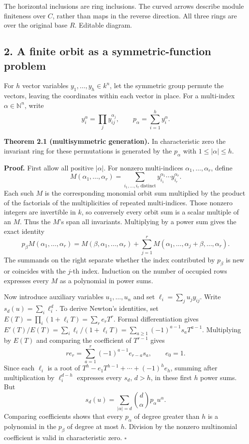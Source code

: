 \documentclass[
]{article}
\begin{document}
The horizontal inclusions are ring inclusions. The curved arrows
describe module finiteness over \(C\), rather than maps in the reverse
direction. All three rings are over the original base \(R\). Editable
diagram.

\subsection{2. A finite orbit as a symmetric-function
problem}\label{a-finite-orbit-as-a-symmetric-function-problem}

For \(h\) vector variables \(y_1,\ldots,y_h\in k^n\), let the symmetric
group permute the vectors, leaving the coordinates within each vector in
place. For a multi-index \(\alpha\in\mathbb N^n\), write \[
y_i^\alpha=\prod_j y_{ij}^{\alpha_j},\qquad
p_\alpha=\sum_{i=1}^h y_i^\alpha.
\]

\protect{}\label{theorem-2-1}{}

\textbf{Theorem 2.1 (multisymmetric generation).} In characteristic zero
the invariant ring for these permutations is generated by the
\(p_\alpha\) with \(1\leq|\alpha|\leq h\).

\textbf{Proof.} First allow all positive \(|\alpha|\). For nonzero
multi-indices \(\alpha_1,\ldots,\alpha_r\), define \[
M(\alpha_1,\ldots,\alpha_r)
=\sum_{i_1,\ldots,i_r\ \mathrm{distinct}}
y_{i_1}^{\alpha_1}\cdots y_{i_r}^{\alpha_r}.
\] Each such \(M\) is the corresponding monomial orbit sum multiplied by
the product of the factorials of the multiplicities of repeated
multi-indices. Those nonzero integers are invertible in \(k\), so
conversely every orbit sum is a scalar multiple of an \(M\). Thus the
\(M\)'s span all invariants. Multiplying by a power sum gives the exact
identity \[
p_\beta M(\alpha_1,\ldots,\alpha_r)
=M(\beta,\alpha_1,\ldots,\alpha_r)
+\sum_{j=1}^r M(\alpha_1,\ldots,\alpha_j+\beta,\ldots,\alpha_r).
\] The summands on the right separate whether the index contributed by
\(p_\beta\) is new or coincides with the \(j\)-th index. Induction on
the number of occupied rows expresses every \(M\) as a polynomial in
power sums.

Now introduce auxiliary variables \(u_1,\ldots,u_n\) and set
\(\ell_i=\sum_j u_jy_{ij}\). Write \(s_d(u)=\sum_i\ell_i^d\). To derive
Newton's identities, set \(E(T)=\prod_i(1+\ell_iT)=\sum_r e_rT^r\).
Formal differentiation gives
\(E'(T)/E(T)=\sum_i\ell_i/(1+\ell_iT)=\sum_{a\geq1}(-1)^{a-1}s_aT^{a-1}\).
Multiplying by \(E(T)\) and comparing the coefficient of \(T^{r-1}\)
gives \[
r e_r=\sum_{a=1}^r(-1)^{a-1}e_{r-a}s_a,\qquad e_0=1.
\] Since each \(\ell_i\) is a root of
\(T^h-e_1T^{h-1}+\cdots+(-1)^he_h\), summing after multiplication by
\(\ell_i^{d-h}\) expresses every \(s_d\), \(d>h\), in these first \(h\)
power sums. But \[
s_d(u)=\sum_{|\alpha|=d}\binom d\alpha p_\alpha u^\alpha.
\] Comparing coefficients shows that every \(p_\alpha\) of degree
greater than \(h\) is a polynomial in the \(p_\beta\) of degree at most
\(h\). Division by the nonzero multinomial coefficient is valid in
characteristic zero. \(\square\)
\end{document}
